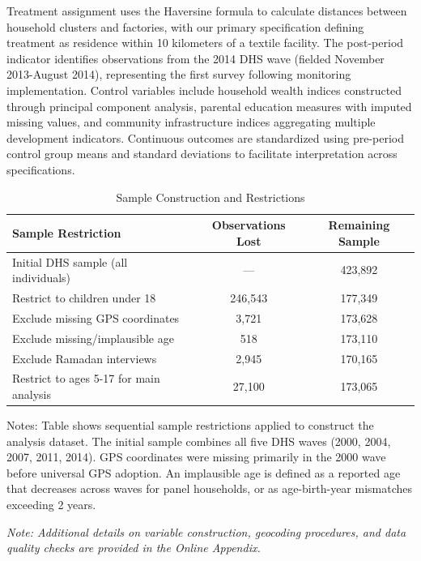 \documentclass[12pt]{article}
\begin{document}
Treatment assignment uses the Haversine formula to calculate distances between household clusters and factories, with our primary specification defining treatment as residence within 10 kilometers of a textile facility. The post-period indicator identifies observations from the 2014 DHS wave (fielded November 2013-August 2014), representing the first survey following monitoring implementation. Control variables include household wealth indices constructed through principal component analysis, parental education measures with imputed missing values, and community infrastructure indices aggregating multiple development indicators. Continuous outcomes are standardized using pre-period control group means and standard deviations to facilitate interpretation across specifications.

\begin{table}[H]
\centering
\caption{Sample Construction and Restrictions}
\label{tab:sample_construction}
\begin{threeparttable}
\begin{tabular}{lcc}
\toprule
Sample Restriction & Observations Lost & Remaining Sample \\
\midrule
Initial DHS sample (all individuals) & --- & 423,892 \\
Restrict to children under 18 & 246,543 & 177,349 \\
Exclude missing GPS coordinates & 3,721 & 173,628 \\
Exclude missing/implausible age & 518 & 173,110 \\
Exclude Ramadan interviews & 2,945 & 170,165 \\
Restrict to ages 5-17 for main analysis & 27,100 & 173,065 \\
\bottomrule
\end{tabular}
\begin{tablenotes}
\footnotesize
\item Notes: Table shows sequential sample restrictions applied to construct the analysis dataset. The initial sample combines all five DHS waves (2000, 2004, 2007, 2011, 2014). GPS coordinates were missing primarily in the 2000 wave before universal GPS adoption. An implausible age is defined as a reported age that decreases across waves for panel households, or as age-birth-year mismatches exceeding 2 years.
\end{tablenotes}
\end{threeparttable}
\end{table}
\textit{Note: Additional details on variable construction, geocoding procedures, and data quality checks are provided in the Online Appendix.}
\end{document}
